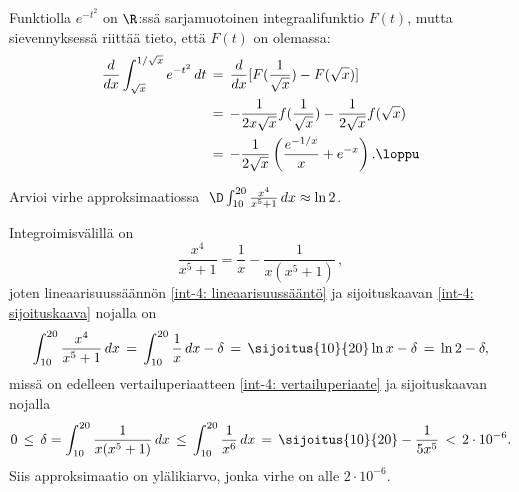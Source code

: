 \ratk Funktiolla $e^{-t^2}$ on $\R$:ssä sarjamuotoinen integraalifunktio $F(t)$, mutta
sievennyksessä riittää tieto, että $F(t)$ on olemassa:
\begin{align*}
\frac{d}{dx}\int_{\sqrt{x}}^{1/\sqrt{x}}e^{-t^2}\, dt 
           &\,=\,\frac{d}{dx} [F(\frac{1}{\sqrt{x}})-F(\sqrt{x})] \\
           &\,=\,-\frac{1}{2x\sqrt{x}}f(\frac{1}{\sqrt{x}})-\frac{1}{2\sqrt{x}}f(\sqrt{x}) \\
           &\,=\, -\frac{1}{2\sqrt{x}}\left(\frac{e^{-1/x}}{x}+e^{-x}\right). \loppu
\end{align*}
\begin{Exa} Arvioi virhe approksimaatiossa
$\ \D\int_{10}^{20}\frac{x^4}{x^5+1}\,dx \approx \ln 2$.
\end{Exa}
\ratk Integroimisvälillä on
\[
\frac{x^4}{x^5+1}=\frac{1}{x}-\frac{1}{x(x^5+1)}\,,
\]
joten lineaarisuussäännön \eqref{int-4: lineaarisuussääntö} ja sijoituskaavan
\eqref{int-4: sijoituskaava} nojalla on
\[
\int_{10}^{20}\frac{x^4}{x^5+1}\,dx \,=\, \int_{10}^{20}\frac{1}{x}\,dx-\delta
                                   \,=\, \sijoitus{10}{20}\ln x -\delta
                                   \,=\, \ln 2 - \delta,
\]
missä on edelleen vertailuperiaatteen \eqref{int-4: vertailuperiaate} ja sijoituskaavan nojalla
\[
0 \,\le\, \delta = \int_{10}^{20}\frac{1}{x(x^5+1)}\,dx
                 \,\le\, \int_{10}^{20}\frac{1}{x^6}\,dx
                 \,=\, \sijoitus{10}{20}-\frac{1}{5x^5}
                 \,<\, 2 \cdot 10^{-6}.
\]
Siis approksimaatio on ylälikiarvo, jonka virhe on alle $2 \cdot 10^{-6}$. \loppu

